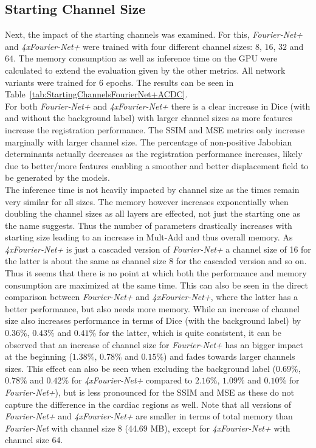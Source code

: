 \documentclass[english,version-2022-01]{uzl-thesis} %
\begin{document}
\subsection{Starting Channel Size} \label{SubSec:ResultsStartingChannelsACDC}
Next, the impact of the starting channels was examined. For this, \emph{Fourier-Net+} and \emph{4xFourier-Net+} were trained with four different channel sizes: $8$, $16$, $32$ and $64$. The memory consumption as well as inference time on the GPU were calculated to extend the evaluation given by the other metrics. All network variants were trained for 6 epochs. The results can be seen in Table~\ref{tab:StartingChannelsFourierNet+ACDC}.\\
For both \emph{Fourier-Net+} and \emph{4xFourier-Net+} there is a clear increase in Dice (with and without the background label) with larger channel sizes as more features increase the registration performance. The SSIM and MSE metrics only increase marginally with larger channel size. The percentage of non-positive Jabobian determinants actually decreases as the registration performance increases, likely due to better/more features enabling a smoother and better displacement field to be generated by the models. \\
The inference time is not heavily impacted by channel size as the times remain very similar for all sizes. The memory however increases exponentially when doubling the channel sizes as all layers are effected, not just the starting one as the name suggests. Thus the number of parameters drastically increases with starting size leading to an increase in Mult-Add and thus overall memory. As \emph{4xFourier-Net+} is just a cascaded version of \emph{Fourier-Net+} a channel size of 16 for the latter is about the same as channel size 8 for the cascaded version and so on. Thus it seems that there is no point at which both the performance and memory consumption are maximized at the same time. This can also be seen in the direct comparison between \emph{Fourier-Net+} and \emph{4xFourier-Net+}, where the latter has a better performance, but also needs more memory. While an increase of channel size also increases performance in terms of Dice (with the background label) by $0.36\%$, $0.43\%$ and $0.41\%$ for the latter, which is quite consistent, it can be observed that an increase of channel size for \emph{Fourier-Net+} has an bigger impact at the beginning ($1.38\%$, $0.78\%$ and $0.15\%$) and fades towards larger channels sizes. This effect can also be seen when excluding the background label ($0.69\%$, $0.78\%$ and $0.42\%$ for \emph{4xFourier-Net+} compared to $2.16\%$, $1.09\%$ and $0.10\%$ for \emph{Fourier-Net+}), but is less pronounced for the SSIM and MSE as these do not capture the difference in the cardiac regions as well. Note that all versions of \emph{Fourier-Net+} and \emph{4xFourier-Net+} are smaller in terms of total memory than \emph{Fourier-Net} with channel size 8 (44.69 MB), except for \emph{4xFourier-Net+} with channel size 64.
\end{document}
